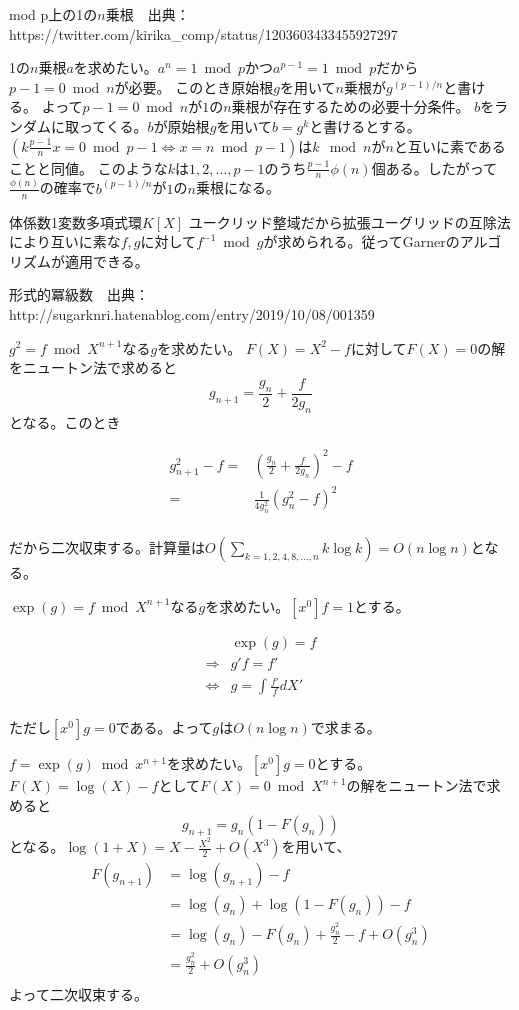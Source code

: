 \documentclass{jsarticle}
\begin{document}
mod p上の1の$n$乗根　出典：https://twitter.com/kirika_comp/status/1203603433455927297

1の$n$乗根$a$を求めたい。$a^n=1 \bmod p$かつ$a^{p-1}=1\bmod p$だから$p-1 = 0 \bmod n $が必要。
このとき原始根$g$を用いて$n$乗根が$g^{(p-1)/n}$と書ける。
よって$p-1=0\bmod n$が$1$の$n$乗根が存在するための必要十分条件。
$b$をランダムに取ってくる。$b$が原始根$g$を用いて$b=g^k$と書けるとする。
$(k\frac{p-1}{n}x=0 \bmod p-1\Leftrightarrow x=n \bmod p-1)$は$k\mod n$が$n$と互いに素であることと同値。
このような$k$は$1,2,\ldots,p-1$のうち$\frac{p-1}{n}\phi(n)$個ある。したがって$\frac{\phi(n)}{n}$の確率で$b^{(p-1)/n}$が$1$の$n$乗根になる。

体係数1変数多項式環$K[X]$
ユークリッド整域だから拡張ユーグリッドの互除法により互いに素な$f,g$に対して$f^{-1} \bmod g$が求められる。従ってGarnerのアルゴリズムが適用できる。


形式的冪級数　出典：http://sugarknri.hatenablog.com/entry/2019/10/08/001359

$g^2=f \bmod X^{n+1}$なる$g$を求めたい。
$F(X)=X^2-f$に対して$F(X)=0$の解をニュートン法で求めると
$$g_{n+1}=\frac{g_n}{2}+\frac{f}{2g_n}$$
となる。このとき

\begin{align}
  g_{n+1}^2-f=&(\frac{g_n}{2}+\frac{f}{2g_n})^2-f\\
  =&\frac{1}{4g_n^2}(g_n^2-f)^2\\
\end{align}

だから二次収束する。計算量は$O(\sum_{k=1,2,4,8,\ldots,n}k\log k)=O(n\log n)$となる。


$\exp(g)=f \bmod X^{n+1}$なる$g$を求めたい。$[x^0]f=1$とする。


\begin{align}
  &\exp(g)=f\\
  \Rightarrow&g'f=f'\\
  \Leftrightarrow&g=\int \frac{f'}{f} dX'\\
\end{align}

ただし$[x^0]g=0$である。よって$g$は$O(n \log n)$で求まる。

$f=\exp(g) \bmod x^{n+1}$を求めたい。$[x^0]g=0$とする。
$F(X)=\log(X)-f$として$F(X)=0\bmod X^{n+1}$の解をニュートン法で求めると
$$g_{n+1}=g_n(1-F(g_n))$$
となる。$\log(1+X)=X-\frac{X^2}{2}+O(X^3)$を用いて、
\begin{align}
  F(g_{n+1})&=\log(g_{n+1})-f\\
  &=\log(g_{n})+\log(1-F(g_n))-f\\
  &=\log(g_{n})-F(g_n)+\frac{g_n^2}{2}-f+O(g_n^3)\\
  &=\frac{g_n^2}{2}+O(g_n^3)\\
\end{align}
よって二次収束する。
\end{document}
